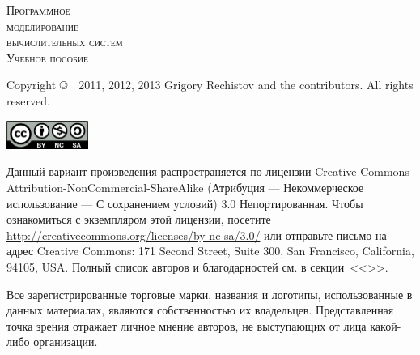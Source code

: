 
\newlength{\centeroffset}
\setlength{\centeroffset}{-0.5\oddsidemargin}
\addtolength{\centeroffset}{0.5\evensidemargin}

\thispagestyle{empty}

\begin{center}
    {\Huge\textsc{Программное \\ моделирование \\ \vspace{3pt} вычислительных систем}}
    \vspace{1cm}\\
    {\Large\textsc{Учебное пособие}}
\end{center}

\noindent\hspace*{\centeroffset}
\pagebreak

\thispagestyle{empty}
\begin{small} 
Copyright \copyright~~2011, 2012, 2013 Grigory Rechistov and the contributors.  All rights reserved.
\begin{center}
    \includegraphics[width=0.2\textwidth]{../cc-by-nc-sa.png}
\end{center}

Данный вариант произведения распространяется по лицензии Creative Commons At\-tri\-bu\-tion-Non\-Com\-mer\-cial-Share\-Alike (Атрибуция — Некоммерческое использование — С сохранением условий) 3.0 Непортированная. Чтобы ознакомиться с экземпляром этой лицензии, посетите \url{http://creativecommons.org/licenses/by-nc-sa/3.0/} или отправьте письмо на адрес Creative Commons: 171 Second Street, Suite 300, San Francisco, California, 94105, USA. 
Полный список авторов и благодарностей см. в секции~<<>>.

Все зарегистрированные торговые марки, названия и логотипы, использованные в данных материалах, являются собственностью их владельцев. Представленная точка зрения отражает личное мнение авторов, не выступающих от лица какой-либо организации.
\end{small}


